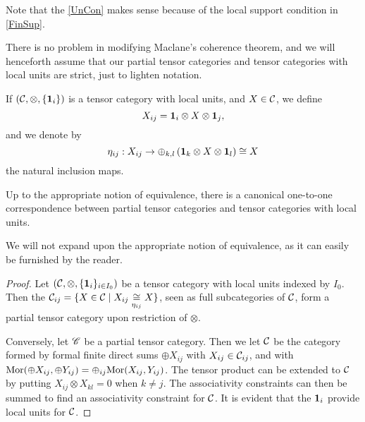 
Note that the \eqref{UnCon} makes sense because of the local support condition in \eqref{FinSup}. 

\begin{Rem} There is no problem in modifying Maclane's coherence theorem, and we will henceforth assume that our partial tensor categories and tensor categories with local units are strict, just to lighten notation. 
\end{Rem}

\begin{Not} If $(\mathcal{C},\otimes,\{\mathbf{1}_i\})$ is a tensor category with local units, and $X\in \mathcal{C}$, we define \[X_{ij} = \mathbf{1}_i\otimes X \otimes \mathbf{1}_j,\] and we denote by \[\eta_{ij}:X_{ij} \rightarrow \oplus_{k,l} \left(\mathbf{1}_k \otimes X \otimes \mathbf{1}_l\right) \cong X\] the natural inclusion maps. 
\end{Not}


\begin{Lem} Up to the appropriate notion of equivalence, there is a canonical one-to-one correspondence between partial tensor categories and tensor categories with local units. 
\end{Lem}

We will not expand upon the appropriate notion of equivalence, as it can easily be furnished by the reader. %

\begin{proof} Let $(\mathcal{C},\otimes,\{\mathbf{1}_i\}_{i\in I_0})$ be a tensor category with local units indexed by $I_0$. Then the $\mathcal{C}_{ij} = \{X \in \mathcal{C}\mid X_{ij} \underset{\eta_{ij}}{\cong} X\}$, seen as full subcategories of $\mathcal{C}$, form a partial tensor category upon restriction of $\otimes$.

Conversely, let $\mathscr{C}$ be a partial tensor category. Then we let $\mathcal{C}$ be the category formed by formal finite direct sums $\oplus X_{ij}$ with $X_{ij}\in \mathcal{C}_{ij}$, and with $\mathrm{Mor}(\oplus X_{ij},\oplus Y_{ij}) = \oplus_{ij} \mathrm{Mor}(X_{ij},Y_{ij})$. The tensor product can be extended to $\mathcal{C}$ by putting $X_{ij} \otimes X_{kl} = 0$ when $k\neq j$. The associativity constraints can then be summed to find an associativity constraint for $\mathcal{C}$. It is evident that the $\mathbf{1}_i$ provide local units for $\mathcal{C}$. 
\end{proof}

